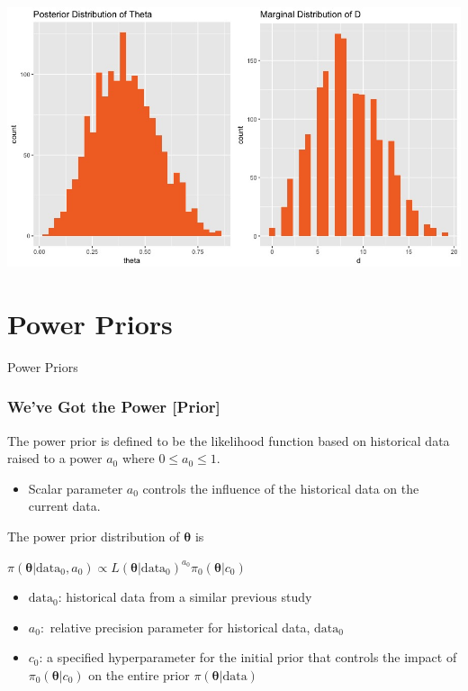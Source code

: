 \documentclass{beamer}
\begin{document}
\begin{frame}
\begin{center}
\includegraphics[scale=0.35]{Rplot.jpeg}
\end{center}
\end{frame}

\section{Power Priors}

\begin{frame}[c]
\begin{center}
\huge
Power Priors
\end{center}
\end{frame}

\begin{frame}
\frametitle{We've Got the Power [Prior]}
The \color{orange} power prior \color{black} is defined to be the likelihood function based on historical data raised to a power $a_{0}$ where $0 \leq a_0 \leq 1$. 
\begin{itemize}
\item Scalar parameter $a_0$ controls the influence of the historical data on the current data.  
\end{itemize}
The power prior distribution of $\pmb{\theta}$ is 
\begin{center}
$\pi(\pmb{\theta}|\text{data}_0, a_0) \propto L(\pmb{\theta}|\text{data}_0)^{a_0}\pi_0(\pmb{\theta}|c_{0})$
\end{center}
\begin{itemize}
\item $\text{data}_0$: historical data from a similar previous study 
\item $a_0:$ relative precision parameter for historical data,  $\text{data}_0$
\item $c_0$: a specified hyperparameter for the initial prior that controls the impact of $\pi_0(\pmb{\theta}|c_{0})$ on the entire prior $\pi(\pmb{\theta}|\text{data})$
\end{itemize}
\end{frame}
\end{document}
